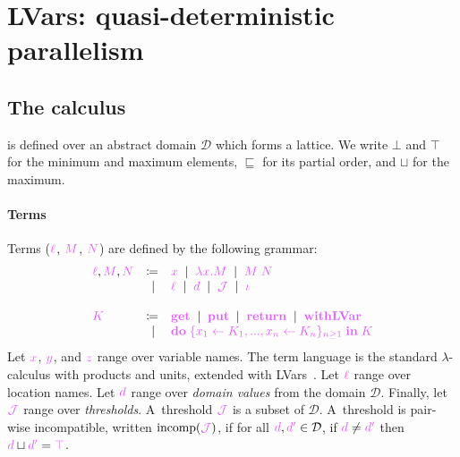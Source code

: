 \documentclass[main.tex]{subfiles}
\begin{document}
\section{LVars: quasi-deterministic parallelism}

\subsection{The \lambdalvar calculus}

\lambdalvar is defined over an abstract domain $\mathcal{D}$ which forms a lattice. We write $\bot$ and $\top$ for the minimum and maximum elements, $\sqsubseteq$ for its partial order, and $\sqcup$ for the maximum.

\paragraph*{Terms}
Terms ($\tm{\ell}$, $\tm{M}$, $\tm{N}$) are defined by the following grammar:
\[
  \begin{array}{lrll}
  \tm{\ell}, \tm{M}, \tm{N}
  & \coloneqq & \tm{x}
     \sep        \tm{\lambda x.M}
     \sep        \tm{M\;N}   \\
  & \sep      & \tm{\ell}
      \sep        \tm{d}
       \sep        \tmJ
       \sep       \tm{\iota}
  \\
  \\
   \tm{K}
  & \coloneqq & \tm{\lvarget}
    \sep        \tm{\lvarput}
    \sep        \tm{\return}
    \sep        \tm{\lvarrun} \\
    & \sep &        \tm{\doh{K_1}{K_n}{K}}
\end{array}
\]
Let $\tm{x}$, $\tm{y}$, and $\tm{z}$ range over variable names. The term language is the standard $\lambda$-calculus with products and units, extended with LVars~\citep{kuper15}. Let $\tm{\ell}$ range over location names. Let $\tm{d}$ range over \emph{domain values} from the domain $\mathcal{D}$. Finally, let $\tmJ$ range over \emph{thresholds}. A~threshold $\tmJ$ is a subset of $\mathcal{D}$. A~threshold is pair-wise incompatible, written $\incomp(\tmJ)$, if for all $\tm{d},\tm{d'}\in\mathcal{D}$, if $\tm{d}\neq\tm{d'}$ then $\tm{d}\sqcup\tm{d'}=\tm{\top}$.
\end{document}
